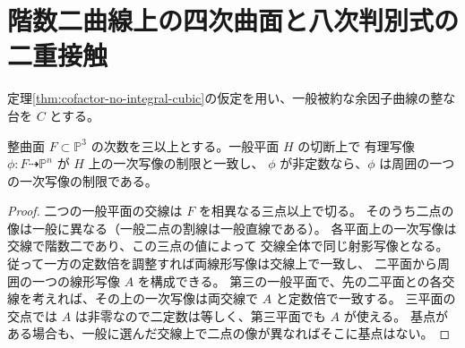 \section{階数二曲線上の四次曲面と八次判別式の二重接触}
\label{sec:cofactor-quartic-contact}
定理\ref{thm:cofactor-no-integral-cubic}の仮定を用い、一般被約な余因子曲線の整な台を $C$ とする。
\begin{lemma}\label{lem:cofactor-linear-gluing}
整曲面 $F\subset\mathbb P^3$ の次数を三以上とする。一般平面 $H$ の切断上で
有理写像 $\phi:F\dashrightarrow\mathbb P^n$ が $H$ 上の一次写像の制限と一致し、
$\phi$ が非定数なら、$\phi$ は周囲の一つの一次写像の制限である。
\end{lemma}
\begin{proof}
二つの一般平面の交線は $F$ を相異なる三点以上で切る。
そのうち二点の像は一般に異なる（一般二点の割線は一般直線である）。
各平面上の一次写像は交線で階数二であり、この三点の値によって
交線全体で同じ射影写像となる。従って一方の定数倍を調整すれば両線形写像は交線上で一致し、
二平面から周囲の一つの線形写像 $A$ を構成できる。
第三の一般平面で、先の二平面との各交線を考えれば、その上の一次写像は両交線で $A$ と定数倍で一致する。
三平面の交点では $A$ は非零なので二定数は等しく、第三平面でも $A$ が使える。
基点がある場合も、一般に選んだ交線上で二点の像が異なればそこに基点はない。
\end{proof}

